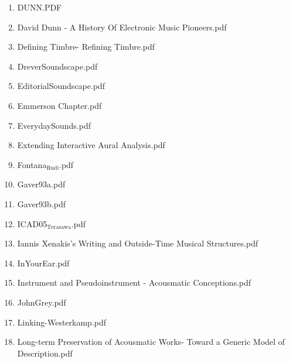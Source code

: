 \documentclass[11pt]{article}
\begin{document}
\begin{enumerate}
\begin{enumerate}
\item DUNN.PDF
\label{sec-1-1-1-1-11-19-29-1-15}

\item David Dunn - A History Of Electronic Music Pioneers.pdf
\label{sec-1-1-1-1-11-19-29-1-16}

\item Defining Timbre- Refining Timbre.pdf
\label{sec-1-1-1-1-11-19-29-1-17}

\item DreverSoundscape.pdf
\label{sec-1-1-1-1-11-19-29-1-18}

\item EditorialSoundscape.pdf
\label{sec-1-1-1-1-11-19-29-1-19}

\item Emmerson Chapter.pdf
\label{sec-1-1-1-1-11-19-29-1-20}

\item EverydaySounds.pdf
\label{sec-1-1-1-1-11-19-29-1-21}

\item Extending Interactive Aural Analysis.pdf
\label{sec-1-1-1-1-11-19-29-1-22}

\item Fontana$_{\text{Rudi}}$.pdf
\label{sec-1-1-1-1-11-19-29-1-23}

\item Gaver93a.pdf
\label{sec-1-1-1-1-11-19-29-1-24}

\item Gaver93b.pdf
\label{sec-1-1-1-1-11-19-29-1-25}

\item ICAD05$_{\text{Terasawa}}$.pdf
\label{sec-1-1-1-1-11-19-29-1-26}

\item Iannis Xenakis’s Writing and Outside-Time Musical Structures.pdf
\label{sec-1-1-1-1-11-19-29-1-27}

\item InYourEar.pdf
\label{sec-1-1-1-1-11-19-29-1-28}

\item Instrument and Pseudoinstrument - Acousmatic Conceptions.pdf
\label{sec-1-1-1-1-11-19-29-1-29}

\item JohnGrey.pdf
\label{sec-1-1-1-1-11-19-29-1-30}

\item Linking-Westerkamp.pdf
\label{sec-1-1-1-1-11-19-29-1-31}

\item Long-term Preservation of Acousmatic Works-  Toward a Generic Model of Description.pdf
\label{sec-1-1-1-1-11-19-29-1-32}


\end{enumerate}
\end{enumerate}
\end{document}
